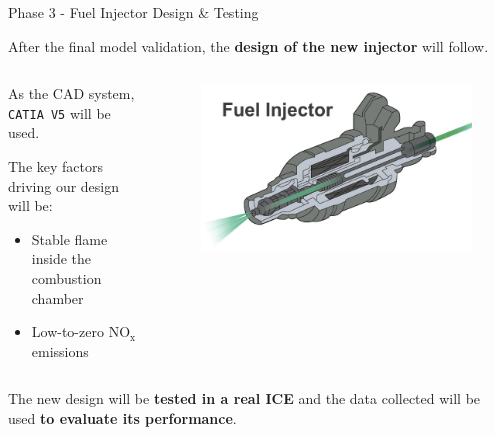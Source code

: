 \begin{frame}{Phase 3 - Fuel Injector Design \& Testing}

    After the final model validation, the \textbf{design of the new injector} will follow.

    \vspace{9pt}

    \begin{columns}[c, onlytextwidth]

        \begin{column}{0.5\textwidth}

            As the CAD system, \texttt{CATIA V5} will be used.

            \vspace{9pt}

            The key factors driving our design will be:

            \begin{itemize}
                \item Stable flame inside the combustion chamber
                \item Low-to-zero $\mathrm{NO_x}$ emissions
            \end{itemize}

        \end{column}

        \begin{column}{0.5\textwidth}

            \begin{figure}
                \centering
                \includegraphics[width=0.9\columnwidth]{img/Fuel-injector.jpg}
            \end{figure}

        \end{column}

    \end{columns}

    \vspace{9pt}

    The new design will be \textbf{tested in a real ICE} and the data collected will be used \textbf{to evaluate its performance}.

\end{frame}